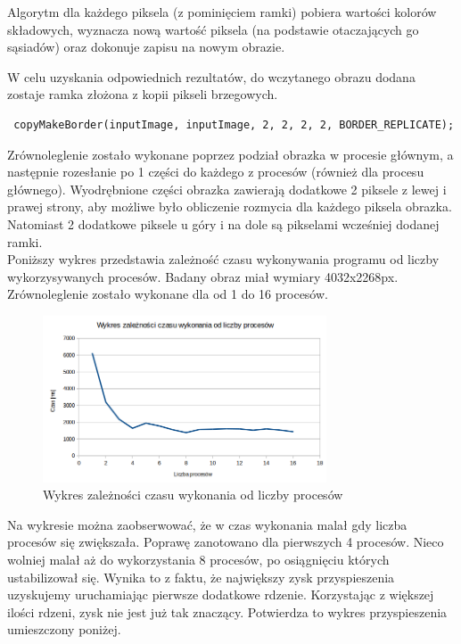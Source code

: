 \documentclass[a4paper,12pt]{article}
\begin{document}
Algorytm dla każdego piksela (z pominięciem ramki) pobiera wartości kolorów składowych, wyznacza nową wartość piksela (na podstawie otaczających go sąsiadów) oraz dokonuje zapisu na nowym obrazie. \newline

\noindent W celu uzyskania odpowiednich rezultatów, do wczytanego obrazu dodana zostaje ramka złożona z kopii pikseli brzegowych. 

\begin{lstlisting}
 copyMakeBorder(inputImage, inputImage, 2, 2, 2, 2, BORDER_REPLICATE);
\end{lstlisting}

Zrównoleglenie zostało wykonane poprzez podział obrazka w procesie głównym, a następnie rozesłanie po 1 części do każdego z procesów (również dla procesu głównego).
Wyodrębnione części obrazka zawierają dodatkowe 2 piksele z lewej i prawej strony, aby możliwe było obliczenie rozmycia dla każdego piksela obrazka. Natomiast 2 dodatkowe piksele u góry i na dole są pikselami wcześniej dodanej ramki.
\\[2\baselineskip]

Poniższy wykres przedstawia zależność czasu wykonywania programu od liczby wykorzysywanych procesów. Badany obraz miał wymiary 4032x2268px. Zrównoleglenie zostało wykonane dla od 1 do 16 procesów.
\begin{figure}[H]
	\centering
  \includegraphics[width=0.75\textwidth]{dane/wykres1.png}
  \caption{Wykres zależności czasu wykonania od liczby procesów}
\end{figure}

Na wykresie można zaobserwować, że w czas wykonania malał gdy liczba procesów się zwiększała. Poprawę zanotowano dla pierwszych 4 procesów. Nieco wolniej malał aż do wykorzystania 8 procesów, po osiągnięciu których ustabilizował się. Wynika to z faktu, że największy zysk przyspieszenia uzyskujemy uruchamiając pierwsze dodatkowe rdzenie. Korzystając z większej ilości rdzeni, zysk nie jest już tak znaczący. Potwierdza to wykres przyspieszenia umieszczony poniżej.
\end{document}
